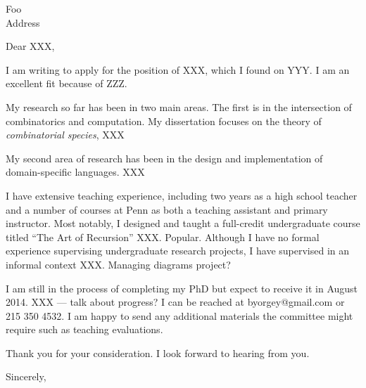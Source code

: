 \documentclass{letter}
\begin{document}
\begin{letter}{Foo \\ Address}

\opening{Dear XXX,}

I am writing to apply for the position of XXX, which I found on YYY.
I am an excellent fit because of ZZZ.

My research so far has been in two main areas.  The first is in the
intersection of combinatorics and computation.  My dissertation
focuses on the theory of \emph{combinatorial species}, XXX

My second area of research has been in the design and implementation
of domain-specific languages. XXX

I have extensive teaching experience, including two years as a high
school teacher and a number of courses at Penn as both a teaching
assistant and primary instructor.  Most notably, I designed and taught
a full-credit undergraduate course titled ``The Art of Recursion''
XXX.  Popular.  Although I have no formal experience supervising
undergraduate research projects, I have supervised in an informal
context XXX.  Managing diagrams project?

I am still in the process of completing my PhD but expect to receive
it in August 2014.  XXX --- talk about progress?  I can be reached at
\textsf{byorgey@gmail.com} or \textsf{215 350 4532}.  I am happy to
send any additional materials the committee might require such as
teaching evaluations.

Thank you for your consideration.  I look forward to hearing from you.

\closing{Sincerely,}

\end{letter}
\end{document}
